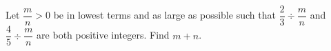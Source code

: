 Let $\dfrac{m}{n}>0$ be in lowest terms and as large as possible such that $\dfrac{2}{3}\div\dfrac{m}{n}$ and $\dfrac{4}{5}\div\dfrac{m}{n}$ are both positive integers. Find $m+n$.
